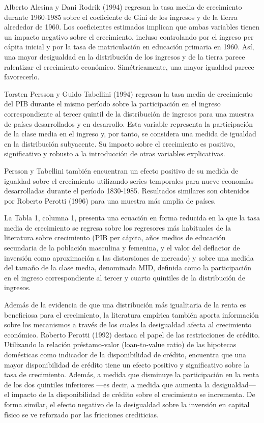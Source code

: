 \documentclass[10pt,a4paper]{article}
\begin{document}
Alberto Alesina y Dani Rodrik (1994) regresan la tasa media de crecimiento durante 1960-1985 sobre el coeficiente de Gini de los ingresos y de la tierra alrededor de 1960. Los coeficientes estimados implican que ambas variables tienen un impacto negativo sobre el crecimiento, incluso controlando por el ingreso per cápita inicial y por la tasa de matriculación en educación primaria en 1960. Así, una mayor desigualdad en la distribución de los ingresos y de la tierra parece ralentizar el crecimiento económico. Simétricamente, una mayor igualdad parece favorecerlo.

Torsten Persson y Guido Tabellini (1994) regresan la tasa media de crecimiento del PIB durante el mismo período sobre la participación en el ingreso correspondiente al tercer quintil de la distribución de ingresos para una muestra de países desarrollados y en desarrollo. Esta variable representa la participación de la clase media en el ingreso y, por tanto, se considera una medida de igualdad en la distribución subyacente. Su impacto sobre el crecimiento es positivo, significativo y robusto a la introducción de otras variables explicativas.

Persson y Tabellini también encuentran un efecto positivo de su medida de igualdad sobre el crecimiento utilizando series temporales para nueve economías desarrolladas durante el período 1830-1985. Resultados similares son obtenidos por Roberto Perotti (1996) para una muestra más amplia de países.

La Tabla 1, columna 1, presenta una ecuación en forma reducida en la que la tasa media de crecimiento se regresa sobre los regresores más habituales de la literatura sobre crecimiento (PIB per cápita, años medios de educación secundaria de la población masculina y femenina, y el valor del deflactor de inversión como aproximación a las distorsiones de mercado) y sobre una medida del tamaño de la clase media, denominada MID, definida como la participación en el ingreso correspondiente al tercer y cuarto quintiles de la distribución de ingresos.

Además de la evidencia de que una distribución más igualitaria de la renta es beneficiosa para el crecimiento, la literatura empírica también aporta información sobre los mecanismos a través de los cuales la desigualdad afecta al crecimiento económico. Roberto Perotti (1992) destaca el papel de las restricciones de crédito. Utilizando la relación préstamo-valor (loan-to-value ratio) de las hipotecas domésticas como indicador de la disponibilidad de crédito, encuentra que una mayor disponibilidad de crédito tiene un efecto positivo y significativo sobre la tasa de crecimiento. Además, a medida que disminuye la participación en la renta de los dos quintiles inferiores —es decir, a medida que aumenta la desigualdad— el impacto de la disponibilidad de crédito sobre el crecimiento se incrementa. De forma similar, el efecto negativo de la desigualdad sobre la inversión en capital físico se ve reforzado por las fricciones crediticias.
\end{document}
